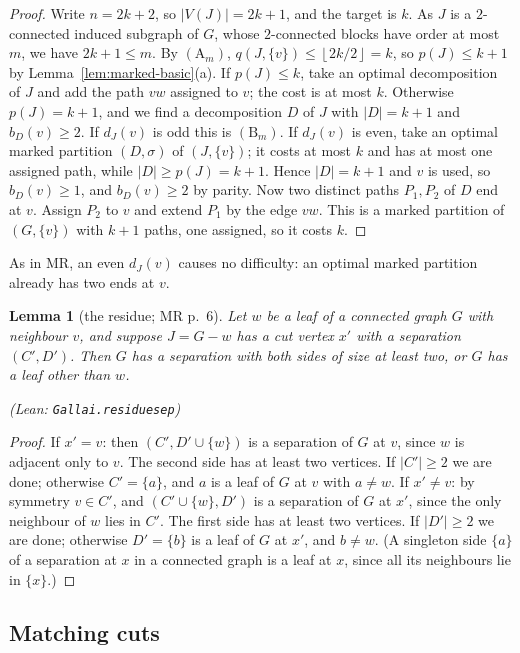 \documentclass[11pt]{amsart}
\newtheorem{lemma}[theorem]{Lemma}
\theoremstyle{definition}
\theoremstyle{remark}
\renewcommand{\_}{\oldunderscore\allowbreak}
\newcommand{\leanst}[1]{\par{\raggedright\small\textup{(Lean: \texttt{#1})}\par}}
\newcommand{\fl}[1]{\left\lfloor #1\right\rfloor}
\newcommand{\TA}{\mathrm{A}}
\newcommand{\TB}{\mathrm{B}}
\begin{document}
\begin{proof}
Write $n=2k+2$, so $|V(J)|=2k+1$, and the target is $k$. As $J$ is a $2$-connected induced subgraph
of $G$, whose $2$-connected blocks have order at most $m$, we have $2k+1\le m$. By $(\TA_m)$,
$q(J,\{v\})\le\fl{2k/2}=k$, so $p(J)\le k+1$ by Lemma~\ref{lem:marked-basic}(a). If $p(J)\le k$,
take an optimal decomposition of $J$ and add the path $vw$ assigned to $v$; the cost is at most $k$.
Otherwise $p(J)=k+1$, and we find a decomposition $D$ of $J$ with $|D|=k+1$ and $b_D(v)\ge2$. If
$d_J(v)$ is odd this is $(\TB_m)$. If $d_J(v)$ is even, take an optimal marked partition
$(D,\sigma)$ of $(J,\{v\})$; it costs at most $k$ and has at most one assigned path, while
$|D|\ge p(J)=k+1$. Hence $|D|=k+1$ and $v$ is used, so $b_D(v)\ge1$, and $b_D(v)\ge2$ by parity.
Now two distinct paths $P_1,P_2$ of $D$ end at $v$. Assign $P_2$ to $v$ and extend $P_1$ by the edge
$vw$. This is a marked partition of $(G,\{v\})$ with $k+1$ paths, one assigned, so it costs $k$.
\end{proof}

As in MR, an even $d_J(v)$ causes no difficulty: an optimal marked partition already has two ends
at $v$.

\begin{lemma}[the residue; MR p.~6]\label{lem:residue}
Let $w$ be a leaf of a connected graph $G$ with neighbour $v$, and suppose $J=G-w$ has a cut vertex
$x'$ with a separation $(C',D')$. Then $G$ has a separation with both sides of size at least two, or
$G$ has a leaf other than $w$.
\leanst{Gallai.residue\_sep}
\end{lemma}

\begin{proof}
If $x'=v$: then $(C',D'\cup\{w\})$ is a separation of $G$ at $v$, since $w$ is adjacent only to $v$.
The second side has at least two vertices. If $|C'|\ge2$ we are done; otherwise $C'=\{a\}$, and $a$
is a leaf of $G$ at $v$ with $a\ne w$. If $x'\ne v$: by symmetry $v\in C'$, and $(C'\cup\{w\},D')$ is
a separation of $G$ at $x'$, since the only neighbour of $w$ lies in $C'$. The first side has at
least two vertices. If $|D'|\ge2$ we are done; otherwise $D'=\{b\}$ is a leaf of $G$ at $x'$, and
$b\ne w$. (A singleton side $\{a\}$ of a separation at $x$ in a connected graph is a leaf at $x$,
since all its neighbours lie in $\{x\}$.)
\end{proof}

\subsection{Matching cuts}
\end{document}
